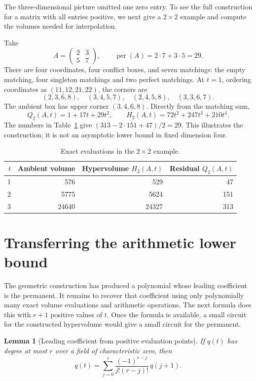 \documentclass[12pt,a4paper]{article}
\newtheorem{lemma}[theorem]{Lemma}
\theoremstyle{definition}
\theoremstyle{remark}
\newcommand{\per}{\operatorname{per}}
\begin{document}
The three-dimensional picture omitted one zero entry. To see the full
construction for a matrix with all entries positive, we next give a
$2\times2$ example and compute the volumes needed for interpolation.

Take
\[
 A=\begin{pmatrix}2&3\\5&7\end{pmatrix},\qquad
 \per(A)=2\cdot7+3\cdot5=29.
\]
There are four coordinates, four conflict boxes, and seven matchings:
the empty matching, four singleton matchings and two perfect matchings.
At $t=1$, ordering coordinates as $(11,12,21,22)$, the corners are
\[
 (2,3,6,8),\quad(3,4,5,7),\quad
 (2,4,5,8),\quad(3,3,6,7).
\]
The ambient box has upper corner $(3,4,6,8)$. Directly from the matching
sum,
\[
 Q_2(A,t)=1+17t+29t^2,\qquad
 H_2(A,t)=72t^2+247t^3+210t^4.
\]
The numbers in Table~\ref{tab:example} give
$(313-2\cdot151+47)/2=29$. This illustrates the construction; it is not
an asymptotic lower bound in fixed dimension four.

\begin{table}[htbp]
\centering
\caption{Exact evaluations in the $2\times2$ example.}
\label{tab:example}
\begin{tabular}{@{}rrrr@{}}
\toprule
$t$ & Ambient volume & Hypervolume $H_2(A,t)$ & Residual $Q_2(A,t)$\\
\midrule
1 & 576 & 529 & 47\\
2 & 5775 & 5624 & 151\\
3 & 24640 & 24327 & 313\\
\bottomrule
\end{tabular}
\end{table}

\section{Transferring the arithmetic lower bound}
\label{sec:transfer}

The geometric construction has produced a polynomial whose leading
coefficient is the permanent. It remains to recover that coefficient
using only polynomially many exact volume evaluations and arithmetic
operations. The next formula does this with $r+1$ positive values of
$t$. Once the formula is available, a small circuit for the constructed
hypervolume would give a small circuit for the permanent.

\begin{lemma}[Leading coefficient from positive evaluation points]
\label{lem:interpolation}
If $q(t)$ has degree at most $r$ over a field of characteristic zero,
then
\begin{equation}
 [t^r]q(t)=\sum_{j=0}^r
       \frac{(-1)^{r-j}}{j!(r-j)!}\,q(j+1).
 \label{eq:interpolation}
\end{equation}
\end{lemma}
\end{document}
